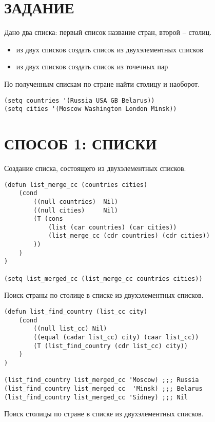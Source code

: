 \section{ЗАДАНИЕ}

Дано два списка: первый список название стран, второй -- столиц.

\begin{itemize}
    \item из двух списков создать список из двухэлементных списков
    \item из двух списков создать список из точечных пар
\end{itemize}

По полученным спискам по стране найти столицу и наоборот.

\begin{lstlisting}
(setq countries '(Russia USA GB Belarus))
(setq cities '(Moscow Washington London Minsk))
\end{lstlisting}

\section{СПОСОБ 1: СПИСКИ}

Создание списка, состоящего из двухэлементных списков.

\begin{lstlisting}
(defun list_merge_cc (countries cities)
    (cond
        ((null countries)  Nil)
        ((null cities)     Nil)
        (T (cons
            (list (car countries) (car cities))
            (list_merge_cc (cdr countries) (cdr cities))
        ))
    )
)

(setq list_merged_cc (list_merge_cc countries cities))
\end{lstlisting}

Поиск страны по столице в списке из двухэлементных списков.

\begin{lstlisting}
(defun list_find_country (list_cc city)
    (cond
        ((null list_cc) Nil)
        ((equal (cadar list_cc) city) (caar list_cc))
        (T (list_find_country (cdr list_cc) city))
    )
)

(list_find_country list_merged_cc 'Moscow) ;;; Russia
(list_find_country list_merged_cc  'Minsk) ;;; Belarus
(list_find_country list_merged_cc 'Sidney) ;;; Nil
\end{lstlisting}

Поиск столицы по стране в списке из двухэлементных списков.

